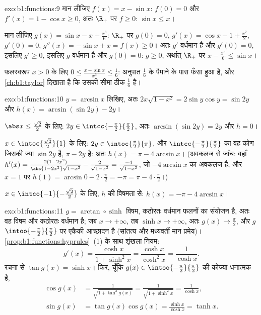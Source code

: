 \begin{solution}{exo:b1:functions:9}
मान लीजिए $f(x) = x - \sin x$: $f(0) = 0$ और $f'(x) = 1 - \cos x \geq 0$,
अतः $\R_+$ पर $f \geq 0$: $\sin x \leq x$।

मान लीजिए $g(x) = \sin x - x + \frac{x^3}{6}$: $\R_+$ पर $g(0) = 0$, $g'(x)
= \cos x - 1 + \frac{x^2}{2}$, $g'(0) = 0$, $g''(x) = -\sin x + x = f(x)
\geq 0$। अतः $g'$ वर्धमान है और $g'(0) = 0$, इसलिए $g' \geq 0$, इसलिए $g$
वर्धमान है और $g(0) = 0$: $g \geq 0$, अर्थात् $\R_+$ पर $x - \frac{x^3}{6}
\leq \sin x$।

फलस्वरूप $x > 0$ के लिए $0 \leq \frac{x - \sin x}{x^3} \leq \frac 16$:
अनुपात $\frac16$ के पैमाने के पास फँसा हुआ है, और \cref{ch:b1:taylor} दिखाता
है कि उसकी सीमा ठीक $\frac 16$ है।
\end{solution}

\begin{solution}{exo:b1:functions:10}
$y = \arcsin x$ लिखिए, अतः $2x\sqrt{1 - x^2} = 2\sin y\cos y = \sin 2y$ और
$h(x) = \arcsin(\sin 2y) - 2y$।

$\abs x \leq \frac{\sqrt 2}{2}$ के लिए: $2y \in
\intcc{-\frac\pi2}{\frac\pi2}$, अतः $\arcsin(\sin 2y) = 2y$ और $h = 0$।

$x \in \intoc{\frac{\sqrt 2}{2}}{1}$ के लिए: $2y \in
\intoc{\frac\pi2}{\pi}$, और $\intcc{-\frac\pi2}{\frac\pi2}$ का वह कोण जिसकी
ज्या $\sin 2y$ है, $\pi - 2y$ है: अतः $h(x) = \pi - 4\arcsin x$। (अवकलज से
जाँच: वहाँ $h'(x) = \frac{2(1 - 2x^2)}{\abs{1 - 2x^2}\sqrt{1 - x^2}} -
\frac{2}{\sqrt{1-x^2}} = \frac{-4}{\sqrt{1 - x^2}}$, जो $-4\arcsin x$ का
अवकलज है; और $x = 1$ पर $h(1) = \arcsin 0 - 2\cdot\frac\pi2 = -\pi = \pi -
4\cdot\frac\pi2$।)

$x \in \intco{-1}{-\frac{\sqrt 2}{2}}$ के लिए, $h$ की विषमता से: $h(x) =
-\pi - 4\arcsin x$।
\end{solution}

\begin{solution}{exo:b1:functions:11}
$g = \arctan \circ \sinh$ विषम, कठोरतः वर्धमान फलनों का संयोजन है, अतः वह
विषम और कठोरतः वर्धमान है; जब $x \to +\infty$, तब $\sinh x \to +\infty$, अतः
$g(x) \to \frac\pi2$, और $g$ $\intoo{-\frac\pi2}{\frac\pi2}$ पर एकैकी
आच्छादन है (सांतत्य और मध्यवर्ती मान प्रमेय)।
\cref{prop:b1:functions:hyprules}~(1) के साथ शृंखला नियम:
\[
g'(x) = \frac{\cosh x}{1 + \sinh^2 x} = \frac{\cosh x}{\cosh^2 x}
= \frac{1}{\cosh x} .
\]
रचना से $\tan g(x) = \sinh x$। फिर, चूँकि $g(x) \in
\intoo{-\frac\pi2}{\frac\pi2}$ की कोज्या धनात्मक है,
\begin{align*}
\cos g(x) &= \frac{1}{\sqrt{1 + \tan^2 g(x)}}
= \frac{1}{\sqrt{1 + \sinh^2 x}} = \frac{1}{\cosh x},\\
\sin g(x) &= \tan g(x) \cos g(x) = \frac{\sinh x}{\cosh x} = \tanh x .
\end{align*}
\end{solution}

